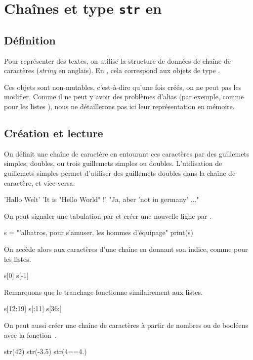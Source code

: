 
\section{Chaînes et type \texttt{str} en \python}

\subsection{Définition}

Pour représenter des textes, on utilise la structure de données de \og chaîne de caractères \fg{} (\emph{string} en anglais). En \python, cela correspond aux objets de type .

Ces objets sont non-mutables, c'est-à-dire qu'une fois créés, on ne peut pas les modifier. 
Comme il ne peut y avoir des problèmes d'alias (par exemple, comme pour les listes \python), nous ne détaillerons pas ici leur représentation en mémoire. 

\subsection{Création et lecture}

On définit une chaîne de caractère en entourant ces caractères par des guillemets simples, doubles, ou trois guillemets simples ou doubles. 
L'utilisation de guillemets simples permet d'utiliser des guillemets doubles dans la chaîne de caractère, et vice-versa.
\begin{pyconsole}
'Hallo Welt'
'It is "Hello World" !'
"Ja, aber 'not in germany' ..."
\end{pyconsole}

On peut signaler une tabulation par \pyv{\t} et créer une nouvelle ligne par \pyv{\n}.
\begin{pyconsole}
s = "\tL'albatros\nSouvent, pour s'amuser, les hommes d'équipage\n[...]"
print(s)
\end{pyconsole}

On accède alors aux caractères d'une chaîne en donnant son indice, comme pour les listes. 
\begin{pyconsole}
s[0]
s[-1]
\end{pyconsole}
Remarquons que le tranchage fonctionne similairement aux listes.
\begin{pyconsole}
s[12:19]
s[:11]
s[36:]
\end{pyconsole}
On peut aussi créer une chaîne de caractères à partir de nombres ou de booléens avec la fonction~.
\begin{pyconsole}
str(42)
str(-3.5)
str(4==4.)
\end{pyconsole}

